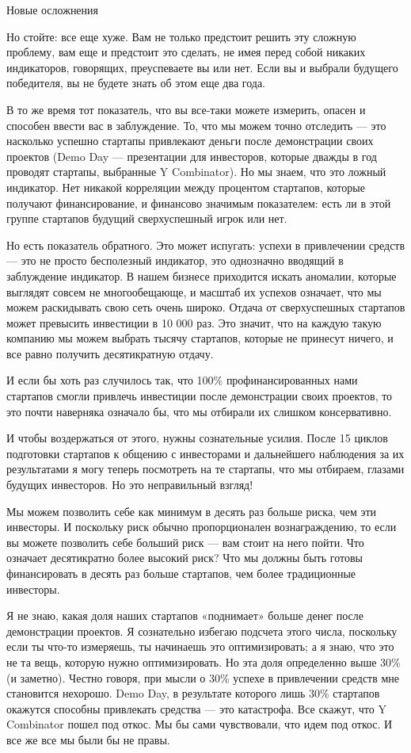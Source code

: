 \documentclass[ebook,12pt,oneside,openany]{memoir}
\begin{document}
Новые осложнения

Но стойте: все еще хуже. Вам не только предстоит решить эту сложную
проблему, вам еще и предстоит это сделать, не имея перед собой никаких
индикаторов, говорящих, преуспеваете вы или нет. Если вы и выбрали
будущего победителя, вы не будете знать об этом еще два года.

В то же время тот показатель, что вы все-таки можете измерить, опасен
и способен ввести вас в заблуждение. То, что мы можем точно отследить
— это насколько успешно стартапы привлекают деньги после демонстрации
своих проектов (Demo Day — презентации для инвесторов, которые дважды
в год проводят стартапы, выбранные Y Combinator). Но мы знаем, что это
ложный индикатор. Нет никакой корреляции между процентом стартапов,
которые получают финансирование, и финансово значимым показателем:
есть ли в этой группе стартапов будущий сверхуспешный игрок или нет.

Но есть показатель обратного. Это может испугать: успехи в привлечении
средств — это не просто бесполезный индикатор, это однозначно вводящий
в заблуждение индикатор. В нашем бизнесе приходится искать аномалии,
которые выглядят совсем не многообещающе, и масштаб их успехов
означает, что мы можем раскидывать свою сеть очень широко. Отдача от
сверхуспешных стартапов может превысить инвестиции в 10 000 раз. Это
значит, что на каждую такую компанию мы можем выбрать тысячу
стартапов, которые не принесут ничего, и все равно получить
десятикратную отдачу.

И если бы хоть раз случилось так, что 100\% профинансированных нами
стартапов смогли привлечь инвестиции после демонстрации своих
проектов, то это почти наверняка означало бы, что мы отбирали их
слишком консервативно.

И чтобы воздержаться от этого, нужны сознательные усилия. После 15
циклов подготовки стартапов к общению с инвесторами и дальнейшего
наблюдения за их результатами я могу теперь посмотреть на те стартапы,
что мы отбираем, глазами будущих инвесторов. Но это неправильный
взгляд!

Мы можем позволить себе как минимум в десять раз больше риска, чем эти
инвесторы. И поскольку риск обычно пропорционален вознаграждению, то
если вы можете позволить себе больший риск — вам стоит на него пойти.
Что означает десятикратно более высокий риск? Что мы должны быть
готовы финансировать в десять раз больше стартапов, чем более
традиционные инвесторы.

Я не знаю, какая доля наших стартапов «поднимает» больше денег после
демонстрации проектов. Я сознательно избегаю подсчета этого числа,
поскольку если ты что-то измеряешь, ты начинаешь это оптимизировать; а
я знаю, что это не та вещь, которую нужно оптимизировать. Но эта доля
определенно выше 30\% (и заметно). Честно говоря, при мысли о 30\%
успехе в привлечении средств мне становится нехорошо. Demo Day, в
результате которого лишь 30\% стартапов окажутся способны привлекать
средства — это катастрофа. Все скажут, что Y Combinator пошел под
откос. Мы бы сами чувствовали, что идем под откос. И все же все мы
были бы не правы.
\end{document}
